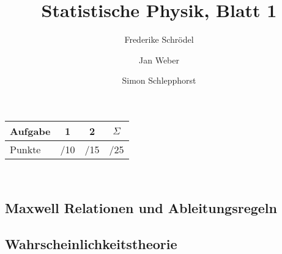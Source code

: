 \documentclass[11pt, ngerman, fleqn, DIV=15, headinclude]{scrartcl}
\title{Statistische Physik, Blatt 1}
\author{
    Frederike Schrödel \and Jan Weber \and Simon Schlepphorst
}
\begin{document}
\maketitle
\begin{center}
	\begin{tabular}{l|c|c|c}
		Aufgabe &1&2&$\Sigma$\\
		\hline
		Punkte &\quad /10 & \quad /15 & \quad /25 
	\end{tabular}\\
\end{center}


\setcounter{section}{1}

\subsection{Maxwell Relationen und Ableitungsregeln}


\subsection{Wahrscheinlichkeitstheorie}
\end{document}
